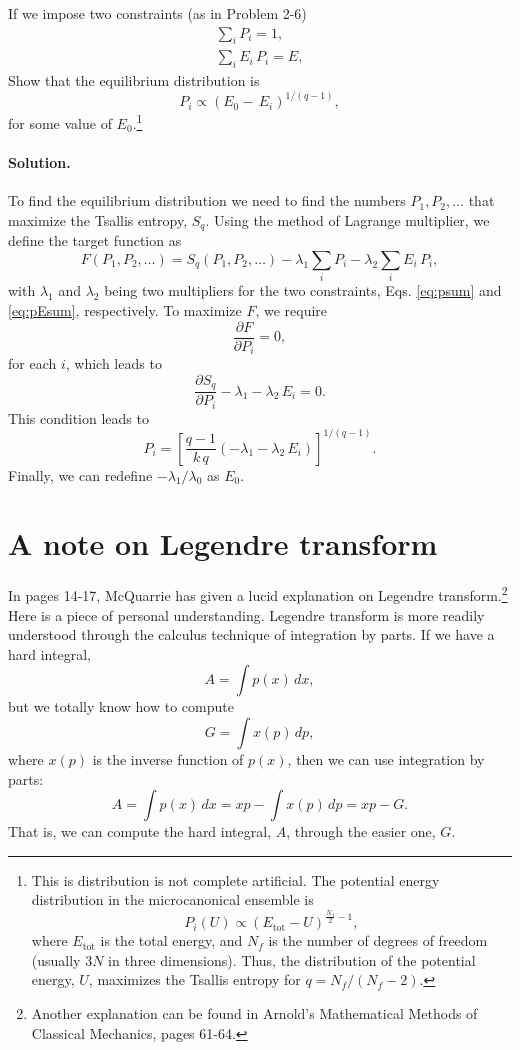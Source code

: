 \documentclass{article}
\begin{document}
If we impose two constraints (as in Problem 2-6)
%
\begin{align}
  \sum_i P_i = 1, \label{eq:psum} \\
  \sum_i E_i \, P_i = E, \label{eq:pEsum}
\end{align}
%
Show that the equilibrium distribution is
$$
P_i \propto (E_0 - \, E_i)^{1/(q-1)},
$$
for some value of $E_0$.\footnote{
  This is distribution is not complete artificial.
  The potential energy distribution in the microcanonical ensemble is
  $$
  P_i(U) \propto (E_\mathrm{tot} - U)^{\frac{N_f}{2} - 1},
  $$
  where
  $E_\mathrm{tot}$ is the total energy, and
  $N_f$ is the number of degrees of freedom (usually $3N$ in three dimensions).
  Thus, the distribution of the potential energy, $U$,
  maximizes the Tsallis entropy for $q = N_f/(N_f - 2)$.
}


\paragraph{Solution.}

To find the equilibrium distribution
we need to find the numbers $P_1, P_2, \dots$
that maximize the Tsallis entropy, $S_q$.
%
Using the method of Lagrange multiplier, we define the target function
as
$$
F(P_1, P_2, \dots)
= S_q(P_1, P_2, \dots) - \lambda_1 \sum_i P_i - \lambda_2 \sum_i E_i \, P_i,
$$
with $\lambda_1$ and $\lambda_2$ being two multipliers
for the two constraints, Eqs. \eqref{eq:psum} and \eqref{eq:pEsum}, respectively.
%
To maximize $F$, we require
$$
\frac{ \partial F } { \partial P_i } = 0,
$$
for each $i$, which leads to
$$
\frac{ \partial S_q } { \partial P_i } - \lambda_1 - \lambda_2 \, E_i = 0.
$$
This condition leads to
$$
P_i = \left[ \frac{q - 1} { k \, q} (-\lambda_1 - \lambda_2 \, E_i) \right]^{1/(q-1)}.
$$
Finally, we can redefine $-\lambda_1/\lambda_0$ as $E_0$.




\section{A note on Legendre transform}

In pages 14-17, McQuarrie has given a lucid explanation on Legendre transform.\footnote{
  Another explanation can be found in Arnold's Mathematical Methods of Classical Mechanics, pages 61-64.
}
%
Here is a piece of personal understanding.
%
Legendre transform is more readily understood
through the calculus technique of integration by parts.
%
If we have a hard integral,
$$A = \int p(x) \, dx,$$
but we totally know how to compute
$$G = \int x(p) \, dp,$$
where $x(p)$ is the inverse function of $p(x)$,
then we can use integration by parts:
%
$$
A = \int p(x) \, dx = x p - \int x(p) \, dp = x p - G.
$$
That is, we can compute the hard integral, $A$, through
the easier one, $G$.
\end{document}
